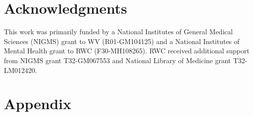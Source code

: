 \documentclass[9pt,twocolumn,twoside]{gsag3jnl}
\begin{document}

\section{Acknowledgments}
This work was primarily funded by a National Institutes of General Medical Sciences (NIGMS) grant to WV (R01-GM104125) and a National Institutes of Mental Health grant to RWC (F30-MH108265).
RWC received additional support from NIGMS grant T32-GM067553 and National Library of Medicine grant T32-LM012420.





\clearpage
\newpage
\section*{Appendix}

\setcounter{figure}{0}
\renewcommand{\thefigure}{A\arabic{figure}}
\end{document}

